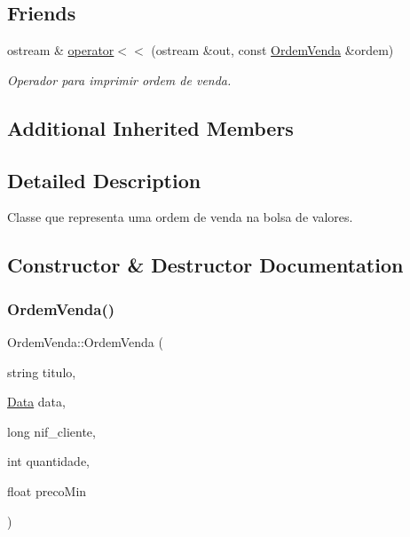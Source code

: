 \subsection*{Friends}
\begin{DoxyCompactItemize}
\item 
ostream \& \hyperlink{class_ordem_venda_a61ee7a51b949c83f00e5a192bb41e911}{operator$<$$<$} (ostream \&out, const \hyperlink{class_ordem_venda}{Ordem\+Venda} \&ordem)
\begin{DoxyCompactList}\small\item\em Operador para imprimir ordem de venda. \end{DoxyCompactList}\end{DoxyCompactItemize}
\subsection*{Additional Inherited Members}


\subsection{Detailed Description}
Classe que representa uma ordem de venda na bolsa de valores. 

\subsection{Constructor \& Destructor Documentation}
\hypertarget{class_ordem_venda_a90290893a4a714fa7e1b15801a00a452}{}\label{class_ordem_venda_a90290893a4a714fa7e1b15801a00a452} 
\subsubsection{\texorpdfstring{Ordem\+Venda()}{OrdemVenda()}}
{\footnotesize\ttfamily Ordem\+Venda\+::\+Ordem\+Venda (\begin{DoxyParamCaption}\item[{string}]{titulo,  }\item[{\hyperlink{class_data}{Data}}]{data,  }\item[{long}]{nif\+\_\+cliente,  }\item[{int}]{quantidade,  }\item[{float}]{preco\+Min }\end{DoxyParamCaption})}




